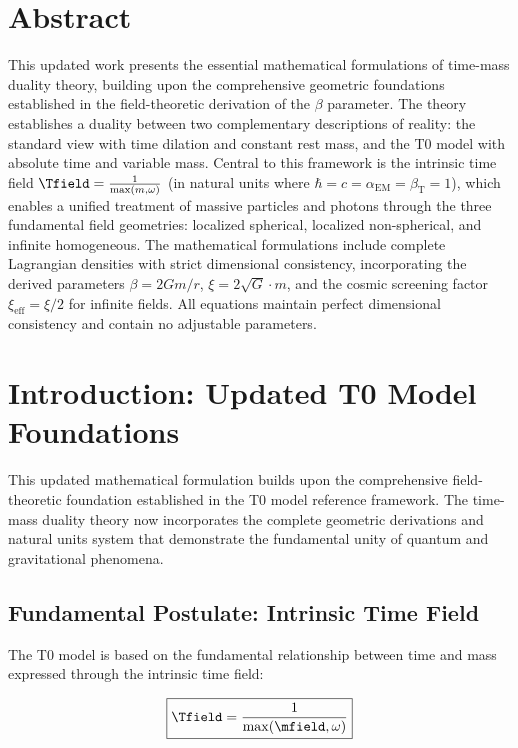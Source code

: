 \section*{Abstract}
		This updated work presents the essential mathematical formulations of time-mass duality theory, building upon the comprehensive geometric foundations established in the field-theoretic derivation of the $\beta$ parameter. The theory establishes a duality between two complementary descriptions of reality: the standard view with time dilation and constant rest mass, and the T0 model with absolute time and variable mass. Central to this framework is the intrinsic time field $\Tfield = \frac{1}{\max(m, \omega)}$ (in natural units where $\hbar = c = \alpha_{\text{EM}} = \beta_{\text{T}} = 1$), which enables a unified treatment of massive particles and photons through the three fundamental field geometries: localized spherical, localized non-spherical, and infinite homogeneous. The mathematical formulations include complete Lagrangian densities with strict dimensional consistency, incorporating the derived parameters $\beta = 2Gm/r$, $\xi = 2\sqrt{G} \cdot m$, and the cosmic screening factor $\xi_{\text{eff}} = \xi/2$ for infinite fields. All equations maintain perfect dimensional consistency and contain no adjustable parameters.

	
	
	
	\section{Introduction: Updated T0 Model Foundations}
	
	This updated mathematical formulation builds upon the comprehensive field-theoretic foundation established in the T0 model reference framework. The time-mass duality theory now incorporates the complete geometric derivations and natural units system that demonstrate the fundamental unity of quantum and gravitational phenomena.
	
	\subsection{Fundamental Postulate: Intrinsic Time Field}
	\label{subsec:fundamental_postulate}
	
	The T0 model is based on the fundamental relationship between time and mass expressed through the intrinsic time field:
	
	\begin{equation}
		\boxed{\Tfield = \frac{1}{\max(\mfield, \omega)}}
		\label{eq:intrinsic_time_field}
	\end{equation}
	
